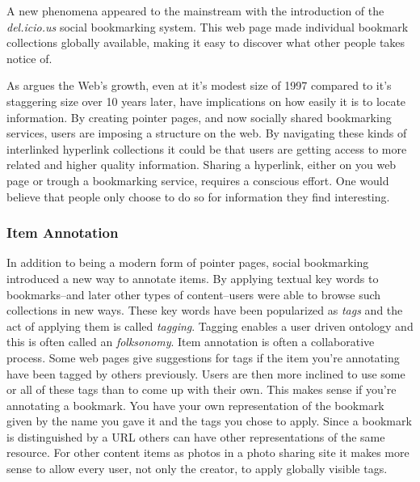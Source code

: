 
A new phenomena appeared to the mainstream with the introduction of the
\emph{del.icio.us}%
\sidenote{
}
social bookmarking system. This web page made individual
bookmark collections globally available, making it easy to discover what other
people takes notice of.

As \citet[p.~806]{dieberger97} argues the Web's growth, even at it's modest
size of 1997 compared to it's staggering size over 10 years later, have
implications on how easily it is to locate information. By creating pointer
pages, and now socially shared bookmarking services, users are imposing a
structure on the web. By navigating these kinds of interlinked hyperlink
collections it could be that users are getting access to more related and
higher quality information. Sharing a hyperlink, either on you web page or
trough a bookmarking service, requires a conscious effort. One would believe
that people only choose to do so for information they find interesting.

\subsubsection{Item Annotation}

In addition to being a modern form of pointer pages, social bookmarking
introduced a new way to annotate items. By applying textual key words to
bookmarks--and later other types of content--users were able to browse such
collections in new ways. These key words have been popularized as \emph{tags}
and the act of applying them is called \emph{tagging}. Tagging enables a user
driven ontology%
and this is often called an \emph{folksonomy}.
Item annotation is often a collaborative process. Some web pages give
suggestions for tags if the item you're annotating have been tagged by others
previously. Users are then more inclined to use some or all of these tags than
to come up with their own. This makes sense if you're annotating a bookmark.
You have your own representation of the bookmark given by the name you gave it
and the tags you chose to apply. Since a bookmark is distinguished by a
URL others can have other representations of the same resource. For other
content items as photos in a photo sharing site it makes more sense to allow
every user, not only the creator, to apply globally visible tags.

